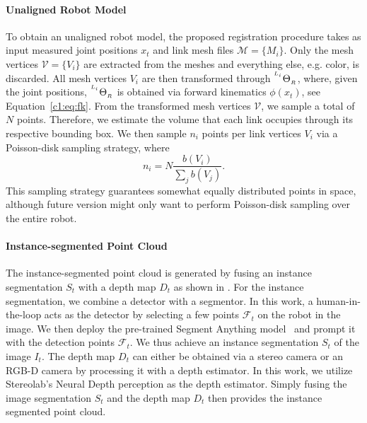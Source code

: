 \paragraph{Unaligned Robot Model}
\label{c1:sec:unaligned_robot_model}
To obtain an unaligned robot model, the proposed registration procedure takes as input measured joint positions $x_t$ and link mesh files $\mathcal{M} = \{M_i\}$. Only the mesh vertices $\mathcal{V} = \{V_i\}$ are extracted from the meshes and everything else, e.g. color, is discarded. All mesh vertices $V_i$ are then transformed through ${}^{^{L_i}}\Theta_{_R}$, where, given the joint positions, ${}^{^{L_i}}\Theta_{_R}$ is obtained via forward kinematics $\phi(x_t)$, see Equation~\ref{c1:eq:fk}. From the transformed mesh vertices $\mathcal{V}$, we sample a total of $N$ points. Therefore, we estimate the volume that each link occupies through its respective bounding box. We then sample $n_i$ points per link vertices $V_i$ via a Poisson-disk sampling strategy, where
\begin{equation}
    n_i = N\frac{b(V_i)}{\sum_j b(V_j)}.
\end{equation}
This sampling strategy guarantees somewhat equally distributed points in space, although future version might only want to perform Poisson-disk sampling over the entire robot.


\paragraph{Instance-segmented Point Cloud}
\label{c1:sec:instance_segmented_point_cloud}
The instance-segmented point cloud is generated by fusing an instance segmentation $S_t$ with a depth map $D_t$ as shown in . For the instance segmentation, we combine a detector with a segmentor. In this work, a human-in-the-loop acts as the detector by selecting a few points $\mathcal{F}_t$ on the robot in the image. We then deploy the pre-trained Segment Anything model~\cite{segment_anything} and prompt it with the detection points $\mathcal{F}_t$. We thus achieve an instance segmentation $S_t$ of the image $I_t$. The depth map $D_t$ can either be obtained via a stereo camera or an RGB-D camera by processing it with a depth estimator. In this work, we utilize Stereolab's Neural Depth perception as the depth estimator. Simply fusing the image segmentation $S_t$ and the depth map $D_t$ then provides the instance segmented point cloud.

